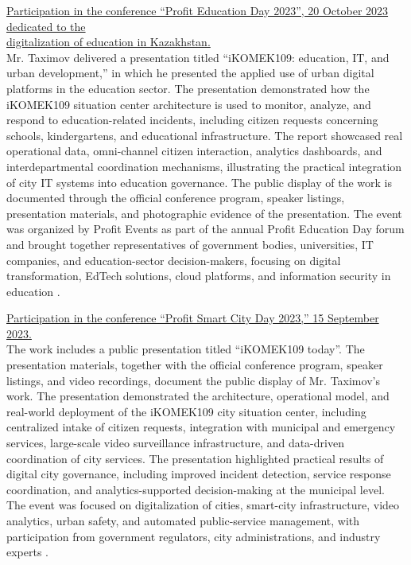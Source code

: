 \noindent\underline{Participation in the conference ``Profit Education Day 2023'', 20 October 2023 dedicated to the} \\
\noindent\underline{digitalization of education in Kazakhstan.} \\
Mr. Taximov delivered a presentation titled ``iKOMEK109: education, IT, and urban development,'' in which he presented the applied use of urban digital platforms in the education sector. The presentation demonstrated how the iKOMEK109 situation center architecture is used to monitor, analyze, and respond to education-related incidents, including citizen requests concerning schools, kindergartens, and educational infrastructure. The report showcased real operational data, omni-channel citizen interaction, analytics dashboards, and interdepartmental coordination mechanisms, illustrating the practical integration of city IT systems into education governance. The public display of the work is documented through the official conference program, speaker listings, presentation materials, and photographic evidence of the presentation. The event was organized by Profit Events as part of the annual Profit Education Day forum and brought together representatives of government bodies, universities, IT companies, and education-sector decision-makers, focusing on digital transformation, EdTech solutions, cloud platforms, and information security in education .

\bigskip

\noindent\underline{Participation in the conference ``Profit Smart City Day 2023,'' 15 September 2023.} \\
The work includes a public presentation titled ``iKOMEK109 today''. The presentation materials, together with the official conference program, speaker listings, and video recordings, document the public display of Mr. Taximov’s work. The presentation demonstrated the architecture, operational model, and real-world deployment of the iKOMEK109 city situation center, including centralized intake of citizen requests, integration with municipal and emergency services, large-scale video surveillance infrastructure, and data-driven coordination of city services. The presentation highlighted practical results of digital city governance, including improved incident detection, service response coordination, and analytics-supported decision-making at the municipal level. The event was focused on digitalization of cities, smart-city infrastructure, video analytics, urban safety, and automated public-service management, with participation from government regulators, city administrations, and industry experts .

